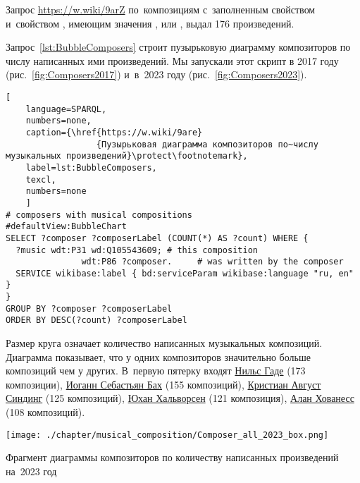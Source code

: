 Запрос \href{https://w.wiki/9arZ}{https://w.wiki/9arZ} 
по~композициям с~заполненным свойством  
и~свойством , 
имеющим значения ,  или , 
выдал 176 произведений.


\newpage
Запрос~\ref{lst:BubbleComposers} строит пузырьковую диаграмму композиторов по числу написанных ими произведений.
Мы запускали этот скрипт в 2017 году (рис.~\ref{fig:Composers2017}) 
и~в~2023 году (рис.~\ref{fig:Composers2023}).


\begin{lstlisting}[ 
    language=SPARQL, 
    numbers=none,
    caption={\href{https://w.wiki/9are}
                  {Пузырьковая диаграмма композиторов по~числу музыкальных произведений}\protect\footnotemark},
    label=lst:BubbleComposers,
    texcl,
    numbers=none
    ]
# composers with musical compositions
#defaultView:BubbleChart
SELECT ?composer ?composerLabel (COUNT(*) AS ?count) WHERE {
  ?music wdt:P31 wd:Q105543609; # this composition
               wdt:P86 ?composer.     # was written by the composer
  SERVICE wikibase:label { bd:serviceParam wikibase:language "ru, en" }
}
GROUP BY ?composer ?composerLabel
ORDER BY DESC(?count) ?composerLabel
\end{lstlisting}%

Размер круга означает количество написанных музыкальных композиций. Диаграмма показывает, что у одних композиторов значительно больше композиций чем у других. В~первую пятерку входят \href{https://ru.wikipedia.org/wiki/Гаде,_Нильс}{Нильс Гаде} (\num{173} композиции), \href{https://ru.wikipedia.org/wiki/Бах,_Иоганн_Себастьян}{Иоганн Себастьян Бах} (\num{155} композиций), \href{https://ru.wikipedia.org/wiki/Синдинг,_Кристиан_Август}{Кристиан Август Синдинг} (\num{125} композиций), \href{https://ru.wikipedia.org/wiki/Хальворсен,_Юхан}{Юхан Хальворсен} (\num{121} композиция), \href{https://ru.wikipedia.org/wiki/Хованесс,_Алан}{Алан Хованесс} (\num{108} композиций).

%
%
\begin{marginfigure}[-6\baselineskip]
  \texttt{[image: ./chapter/musical\_composition/Composer\_all\_2023\_box.png]}
  \vspace{-7pt}
  \caption[Пузырьковая диаграмма композиторов по количеству написанных композиций на~2023 год]
    {Фрагмент диаграммы композиторов по количеству написанных произведений на~2023 год}%
  \label{fig:Composers2023}%
\end{marginfigure}

